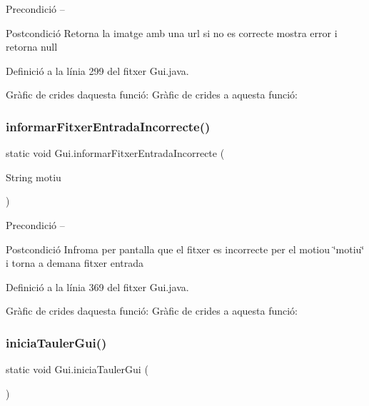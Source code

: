 \begin{DoxyPrecond}{Precondició}
-- 
\end{DoxyPrecond}
\begin{DoxyPostcond}{Postcondició}
Retorna la imatge amb una url si no es correcte mostra error i retorna null 
\end{DoxyPostcond}


Definició a la línia 299 del fitxer Gui.\+java.

Gràfic de crides d\textquotesingle{}aquesta funció\+:
Gràfic de crides a aquesta funció\+:
\mbox{\label{class_gui_a8b9b8f9acdd74b7126e53ac95f3cccb8}} 
\subsubsection{\texorpdfstring{informar\+Fitxer\+Entrada\+Incorrecte()}{informarFitxerEntradaIncorrecte()}}
{\footnotesize\ttfamily static void Gui.\+informar\+Fitxer\+Entrada\+Incorrecte (\begin{DoxyParamCaption}\item[{String}]{motiu }\end{DoxyParamCaption})\hspace{0.3cm}{\ttfamily [static]}}

\begin{DoxyPrecond}{Precondició}
-- 
\end{DoxyPrecond}
\begin{DoxyPostcond}{Postcondició}
Infroma per pantalla que el fitxer es incorrecte per el motiou \char`\"{}motiu\char`\"{} i torna a demana fitxer entrada 
\end{DoxyPostcond}


Definició a la línia 369 del fitxer Gui.\+java.

Gràfic de crides d\textquotesingle{}aquesta funció\+:
Gràfic de crides a aquesta funció\+:
\mbox{\label{class_gui_ac684b0bf06300f74e400adacc2ec22d1}} 
\subsubsection{\texorpdfstring{inicia\+Tauler\+Gui()}{iniciaTaulerGui()}}
{\footnotesize\ttfamily static void Gui.\+inicia\+Tauler\+Gui (\begin{DoxyParamCaption}{ }\end{DoxyParamCaption})\hspace{0.3cm}{\ttfamily [static]}}

